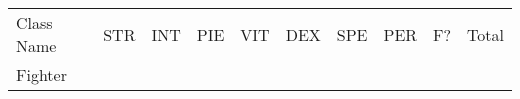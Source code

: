 \documentclass[12pt]{article}
\newcommand{\indexClass}[1]{\index{#1}}
\newcommand{\class}[1]{#1\indexClass{#1}}
\begin{document}
\begin{longtable}[]{@{}llllllllll@{}}
\toprule
\begin{minipage}[t]{0.13\columnwidth}\raggedright\strut
Class Name
\strut\end{minipage} &
\begin{minipage}[t]{0.06\columnwidth}\raggedright\strut
STR
\strut\end{minipage} &
\begin{minipage}[t]{0.06\columnwidth}\raggedright\strut
INT
\strut\end{minipage} &
\begin{minipage}[t]{0.06\columnwidth}\raggedright\strut
PIE
\strut\end{minipage} &
\begin{minipage}[t]{0.06\columnwidth}\raggedright\strut
VIT
\strut\end{minipage} &
\begin{minipage}[t]{0.06\columnwidth}\raggedright\strut
DEX
\strut\end{minipage} &
\begin{minipage}[t]{0.06\columnwidth}\raggedright\strut
SPE
\strut\end{minipage} &
\begin{minipage}[t]{0.06\columnwidth}\raggedright\strut
PER
\strut\end{minipage} &
\begin{minipage}[t]{0.07\columnwidth}\raggedright\strut
F?
\strut\end{minipage} &
\begin{minipage}[t]{0.08\columnwidth}\raggedright\strut
Total
\strut\end{minipage}\tabularnewline
\begin{minipage}[t]{0.13\columnwidth}\raggedright\strut
\class{Fighter}
\strut\end{minipage} &
\begin{minipage}[t]{0.06\columnwidth}\raggedright\strut
\strut\end{minipage} &
\begin{minipage}[t]{0.06\columnwidth}\raggedright\strut
\strut\end{minipage} &
\begin{minipage}[t]{0.06\columnwidth}\raggedright\strut
\strut\end{minipage} &
\begin{minipage}[t]{0.06\columnwidth}\raggedright\strut
\strut\end{minipage} &
\begin{minipage}[t]{0.06\columnwidth}\raggedright\strut

\end{minipage}
\end{longtable}
\end{document}
